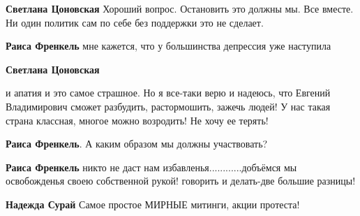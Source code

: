 \begin{itemize}
\begin{itemize}
\textbf{Светлана Цоновская} Хороший вопрос. Остановить это должны мы. Все вместе. Ни один политик сам по себе без поддержки это не сделает.

 
\textbf{Раиса Френкель} мне кажется, что у большинства депрессия уже наступила

 
\textbf{Светлана Цоновская} 

и апатия и это самое страшное. Но я все-таки верю и
надеюсь, что Евгений Владимирович сможет разбудить, растормошить, зажечь людей! У
нас такая страна классная, многое можно возродить! Не хочу ее терять!


 
\textbf{Раиса Френкель}. А каким образом мы должны участвовать?

 
\textbf{Раиса Френкель} никто не даст нам избавленья............добъёмся мы освобожденья своею собственной рукой! говорить и делать-две большие разницы!

 
\textbf{Надежда Сурай} Самое простое МИРНЫЕ митинги, акции протеста!

 

\end{itemize}
\end{itemize}
